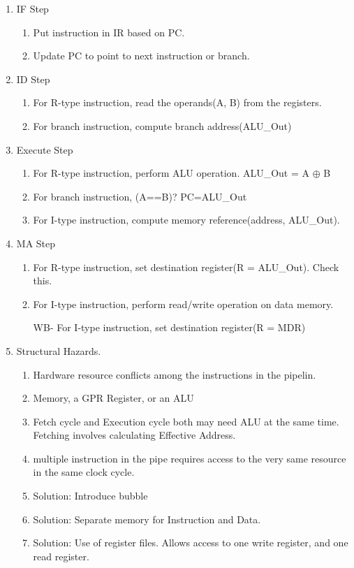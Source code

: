 \begin{enumerate}
    \newpage

    \item IF Step
    \begin{enumerate}
        \item Put instruction in IR based on PC.
        \item Update PC to point to next instruction or branch.
    \end{enumerate}

    \item ID Step
    \begin{enumerate}
        \item For R-type instruction, read the operands(A, B) from the registers.
        \item For branch instruction, compute branch address(ALU\_Out)
    \end{enumerate}

    \item Execute Step
    \begin{enumerate}
        \item For R-type instruction, perform ALU operation. ALU\_Out = A {\large \(\oplus\)} B
        \item For branch instruction, (A==B)? \; PC=ALU\_Out
        \item For I-type instruction, compute memory reference(address, ALU\_Out).
    \end{enumerate}

    \item MA Step
    \begin{enumerate}
        \item For R-type instruction, set destination register(R = ALU\_Out). Check this.
        \item For I-type instruction, perform read/write operation on data memory.
        \item[WB-] For I-type instruction, set destination register(R = MDR)
    \end{enumerate}

    \item Structural Hazards.
    \begin{enumerate}
        \item Hardware resource conflicts among the instructions in the pipelin.
        \item Memory, a GPR Register, or an ALU
        \item Fetch cycle and Execution cycle both may need ALU at the same time. Fetching involves calculating Effective Address.
        \item multiple instruction in the pipe requires access to the very same resource in the same clock cycle.
        \item Solution: Introduce bubble
        \item Solution: Separate memory for Instruction and Data.
        \item Solution: Use of register files. Allows access to one write register, and one read register.
    \end{enumerate}


\end{enumerate}
